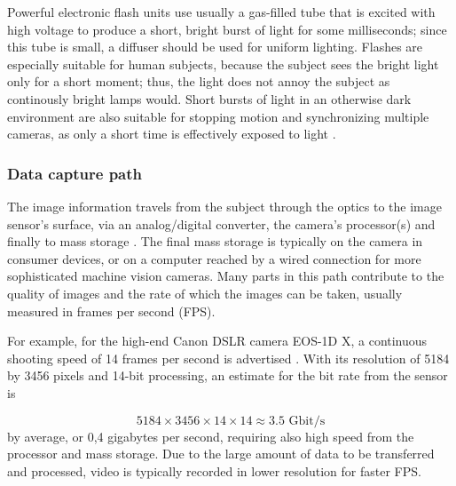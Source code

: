 Powerful electronic flash units use usually a gas-filled tube that is excited with high voltage to produce a short, bright burst of light for some milliseconds;
since this tube is small, a diffuser should be used for uniform lighting.
Flashes are especially suitable for human subjects, because the subject sees the bright light only for a short moment; thus, the light does not annoy the subject as continously bright lamps would.
Short bursts of light in an otherwise dark environment are also suitable for stopping motion and synchronizing multiple cameras, as only a short time is effectively exposed to light \cite{langford2000basic}.


\subsubsection{Data capture path} %

The image information travels from the subject through the optics to the image sensor's surface, via an analog/digital converter, the camera's processor(s) and finally to mass storage \cite{szeliski10vision}.
The final mass storage is typically on the camera in consumer devices, or on a computer reached by a wired connection for more sophisticated machine vision cameras.
Many parts in this path contribute to the quality of images and the rate of which the images can be taken, usually measured in frames per second (FPS).



For example, for the high-end Canon DSLR camera EOS-1D X, a continuous shooting speed of 14 frames per second is advertised \cite{eos1dx}.
With its resolution of 5184 by 3456 pixels and 14-bit processing, an estimate for the bit rate from the sensor is

\begin{equation} \label{eq:eos1dspeed}
5184 \times 3456 \times 14 \times 14 \approx 3.5\text{ Gbit/s}
\end{equation}
by average, or 0,4 gigabytes per second, requiring also high speed from the processor and mass storage.
Due to the large amount of data to be transferred and processed, video is typically recorded in lower resolution for faster FPS.

